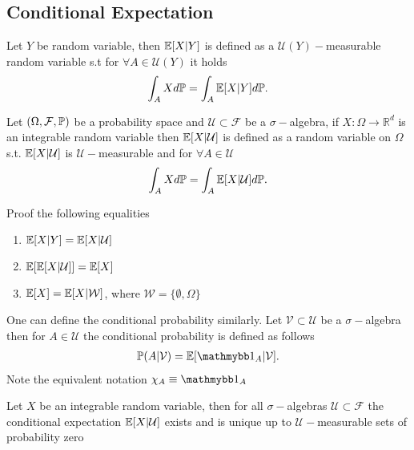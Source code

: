 \subsection{Conditional Expectation}
\begin{definition}
  Let $Y$ be random variable, then $\E[X|  Y] $ is defined as a $\mathcal{U}(Y)-$measurable random variable
  s.t for $\forall  A \in \mathcal{U}(Y)$ it holds 
  \begin{align*}
    \int_A X d\P = \int_A \E[X|Y] d\P
  .\end{align*}
\end{definition}
\begin{definition}
 Let $(\Omega ,\mathcal{F},\P)$  be a probability space and $\mathcal{ U} \subset  \mathcal{F}$ be a $\sigma-$algebra,
 if $X  : \Omega  \to  \mathbb{R}^{d} $ is an integrable random variable then $\E[X |\mathcal{U}]$  is
 defined as a random variable on $\Omega$ s.t. $\E[X | \mathcal{U}]$ is $\mathcal{U}-$measurable and for $\forall A \in  \mathcal{U}$
 \begin{align*}
   \int_A X d\P  = \int_A \E[X | \mathcal{U}] d \P
 .\end{align*}
\end{definition}
\begin{exercise}
 Proof the following equalities  
 \begin{enumerate}
   \item $\E[X|Y] = \E[X | \mathcal{U}]$
   \item $\E[\E[X|\mathcal{U}]] = \E[X]$
   \item $\E[X] = \E[X | \mathcal{W}]$, where $\mathcal{W} = \{\emptyset,\Omega \}  $
 \end{enumerate}
\end{exercise}
\begin{remark}
 One can define the conditional probability similarly. Let $\mathcal{V} \subset  \mathcal{U}$  be a $\sigma-$algebra 
 then for $A \in  \mathcal{U}$ the conditional probability is defined as follows
 \begin{align*}
   \P(A | \mathcal{V}) = \E[\cha_A | \mathcal{V}]
 .\end{align*}
Note the equivalent notation $\chi_A \equiv \cha_A$
\end{remark}
\begin{theorem}
 Let $X$ be an integrable random variable, then for all $\sigma-$algebras $\mathcal{U} \subset  \mathcal{F}$  the 
 conditional expectation $\E[X | \mathcal{U}]$ exists and is unique up to $\mathcal{U}-$measurable sets of probability
 zero
\end{theorem}
